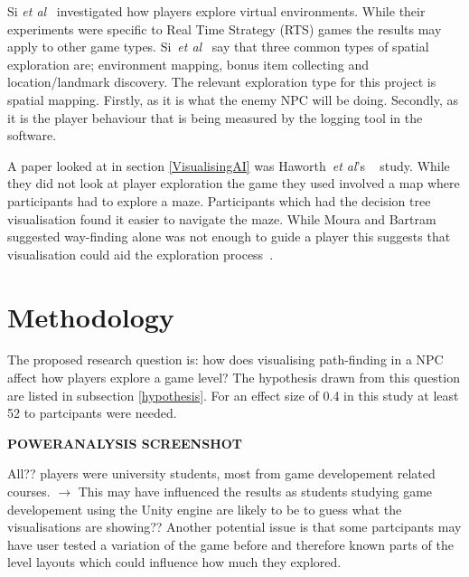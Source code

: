 \documentclass[journal]{IEEEtran}
\begin{document}
Si \textit{et al}~\cite{si2017} investigated how players explore virtual environments. While their experiments were specific to Real Time Strategy (RTS) games the results may apply to other game types. Si~\textit{et al}~\cite{si2017} say that three common types of spatial exploration are; environment mapping, bonus item collecting and location/landmark discovery. The relevant exploration type for this project is spatial mapping. Firstly, as it is what the enemy NPC will be doing.  Secondly, as it is the player behaviour that is being measured by the logging tool in the software.

A paper looked at in section \ref{VisualisingAI} was Haworth~\textit{et al}'s ~\cite{Haworth2010} study. While they did not look at player exploration the game they used involved a map where participants had to explore a maze. Participants which had the decision tree visualisation found it easier to navigate the maze. While Moura and Bartram~\cite{moura2014} suggested way-finding alone was not enough to guide a player this suggests that visualisation could aid the exploration process~\cite{Haworth2010}.

\section{Methodology} \label{methodology}
The proposed research question is: how does visualising path-finding in a NPC affect how players explore a game level? The hypothesis drawn from this question are listed in subsection \ref{hypothesis}.  For an effect size of 0.4 in this study at least 52 to partcipants were needed. 

\textbf{POWERANALYSIS SCREENSHOT}

All?? players were university students, most from game developement related courses. $\to$ This may have influenced the results as students studying game developement using the Unity engine are likely to be to guess what the visualisations are showing??
Another potential issue is that some partcipants may have user tested a variation of the game before and therefore known parts of the level layouts which could influence how much they explored. 
\end{document}
